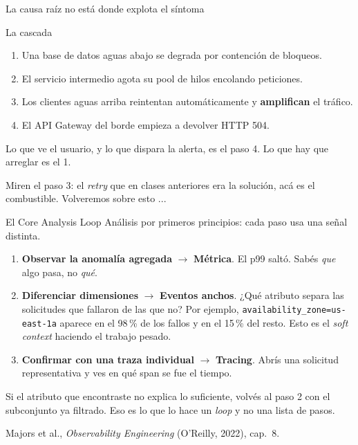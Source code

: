 \documentclass[institutional,screen,none]{../cls/ua-engineering-v6-beamer}
\begin{document}

\begin{frame}{La causa raíz no está donde explota el síntoma}
\begin{alertblock}{La cascada}
\begin{enumerate}
\item Una base de datos aguas abajo se degrada por contención de bloqueos.
\item El servicio intermedio agota su pool de hilos encolando peticiones.
\item Los clientes aguas arriba reintentan automáticamente y \textbf{amplifican} el tráfico.
\item El API Gateway del borde empieza a devolver HTTP 504.
\end{enumerate}
\end{alertblock}

\pause

Lo que ve el usuario, y lo que dispara la alerta, es el paso 4. Lo que hay que arreglar es el 1.

\pause

{\small Miren el paso 3: el \emph{retry} que en clases anteriores era la solución, acá es el combustible. Volveremos sobre esto ...}
\end{frame}

\begin{frame}{El Core Analysis Loop}
Análisis por primeros principios: cada paso usa una señal distinta.

\begin{enumerate}
\item \textbf{Observar la anomalía agregada} $\rightarrow$ \textbf{Métrica}. El p99 saltó. Sabés \emph{que} algo pasa, no \emph{qué}.
\pause
\item \textbf{Diferenciar dimensiones} $\rightarrow$ \textbf{Eventos anchos}. ¿Qué atributo separa las solicitudes que fallaron de las que no? Por ejemplo, \texttt{availability\_zone=us-east-1a} aparece en el 98\,\% de los fallos y en el 15\,\% del resto. Esto es el \emph{soft context} haciendo el trabajo pesado.
\pause
\item \textbf{Confirmar con una traza individual} $\rightarrow$ \textbf{Tracing}. Abrís una solicitud representativa y ves en qué span se fue el tiempo.
\end{enumerate}

\pause

{\small Si el atributo que encontraste no explica lo suficiente, volvés al paso 2 con el subconjunto ya filtrado. Eso es lo que lo hace un \emph{loop} y no una lista de pasos.}

{\scriptsize\color{UAIngMuted}Majors et al., \emph{Observability Engineering} (O'Reilly, 2022), cap.~8.}
\end{frame}
\end{document}
